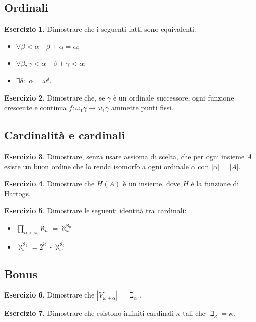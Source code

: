 \documentclass[a4paper,10pt,oneside]{article}
\newcommand{\abs}[1]{\left|#1\right|}
\theoremstyle{plain}
\theoremstyle{definition}
\newtheorem{myex}{Esercizio}
\theoremstyle{remark}
\begin{document}
\subsection{Ordinali}

\begin{myex} Dimostrare che i seguenti fatti sono equivalenti:
\begin{itemize}
 \item $\forall \beta < \alpha \quad \beta + \alpha=\alpha$;
 \item $\forall \beta,\gamma <\alpha \quad \beta +\gamma <\alpha$;
 \item $\exists \delta: \; \alpha=\omega^\delta$.
\end{itemize}
\end{myex}

\begin{myex}\label{ex:puntifissi}
 Dimostrare che, se $\gamma$ è un ordinale successore, ogni funzione crescente e continua $f:\omega_1\gamma\rightarrow\omega_1\gamma$ ammette punti fissi.
\end{myex}


\subsection{Cardinalità e cardinali}
\begin{myex}
 Dimostrare, senza usare assioma di scelta, che per ogni insieme $A$ esiste un buon ordine che lo renda isomorfo a ogni ordinale $\alpha$ con $\abs\alpha=\abs A$.
\end{myex}
\begin{myex}\label{ex:Hart}
 Dimostrare che $H(A)$ è un insieme, dove $H$ è la funzione di Hartogs.
\end{myex}
\begin{myex}
 Dimostrare le seguenti identità tra cardinali:
 \begin{itemize}
  \item $\prod_{n<\omega}\aleph_n=\aleph_\omega^{\aleph_0}$
  \item $\aleph_\omega^{\aleph_1}=2^{\aleph_1}\cdot \aleph_\omega^{\aleph_0}$
 \end{itemize}
\end{myex}

\subsection{Bonus}

\begin{myex}
 Dimostrare che $\abs{V_{\omega+\alpha}}=\beth_\alpha$.
\end{myex}

\begin{myex}
 Dimostrare che esistono infiniti cardinali $\kappa$ tali che $\beth_\kappa=\kappa$.
\end{myex}
\end{document}
